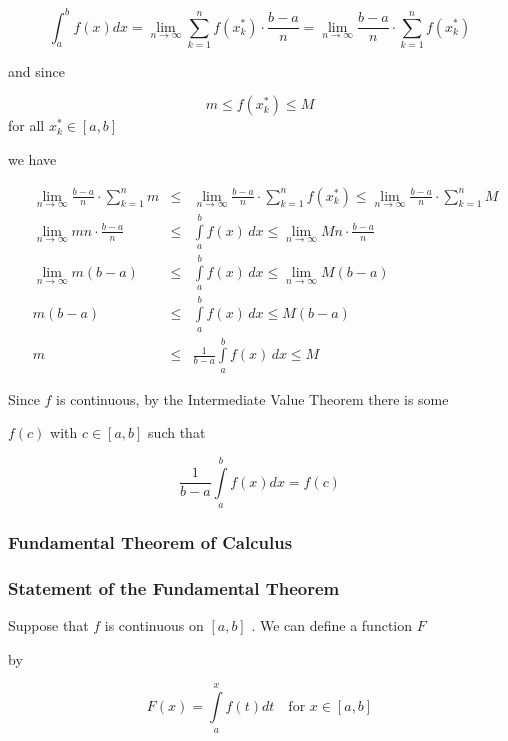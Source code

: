 \[
\int_a^b f(x) dx = \lim _{n \to \infty} \sum _{k=1}^n f(x_k^*) \cdot \frac{b-a}{n} = \lim _{n \to \infty} \frac{b-a}{n} \cdot \sum _{k=1}^n f(x_k^{*})
\]


and since


\[
m\le f(x_k^{*})\le M
\] for all $x_k^{*}\in[a,b]$


we have

\begin{align}
& \lim _{n\to\infty}\frac{b-a}{n}\cdot\sum _{k=1}^n m &\le & \lim _{n\to\infty}\frac{b-a}{n}\cdot\sum _{k=1}^n f(x_k^{*})\le\lim _{n\to\infty}\frac{b-a}{n}\cdot\sum _{k=1}^n M \\& \lim _{n\to\infty} m n\cdot\frac{b-a}{n} &\le &  \int\limits_a^b f(x)\,dx\le\lim _{n\to\infty} M n\cdot\frac{b-a}{n} \\& \lim _{n\to\infty} m(b-a) &\le & \int\limits_a^b f(x)\,dx\le\lim _{n\to\infty} M(b-a) \\& m(b-a) &\le & \int\limits_a^b f(x)\,dx\le M(b-a) \\& m &\le & \frac{1}{b-a}\int\limits_a^b f(x)\,dx\le M
\end{align}


Since $f$ is continuous, by the Intermediate Value Theorem there is some

$f(c)$ with $c\in[a,b]$ such that


\[
\frac{1}{b-a}\int\limits_a^b f(x)dx=f(c)
\]


\subsubsection{Fundamental Theorem of Calculus}
\label{sss:fund-9421}


\subsubsection{Statement of the Fundamental Theorem}
\label{sss:stat-adcd}


Suppose that $f$ is continuous on $[a,b]$ . We can define a function $F$

by


\[
F(x)=\int\limits_a^x f(t)dt\quad\text{for }x\in[a,b]
\]


